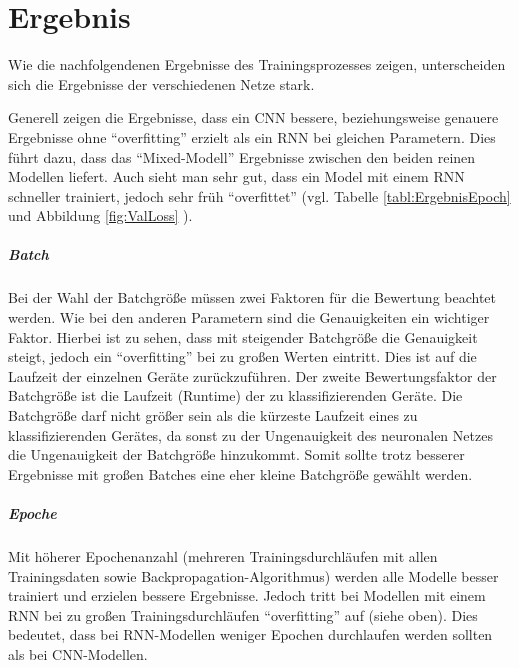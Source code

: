 \chapter{Ergebnis}\label{Ergebnis}

    Wie die nachfolgendenen Ergebnisse des Trainingsprozesses zeigen, unterscheiden sich die Ergebnisse der verschiedenen Netze stark.

    Generell zeigen die Ergebnisse, dass ein \ac{CNN} bessere, beziehungsweise genauere Ergebnisse ohne "`overfitting"' erzielt als ein \ac{RNN} bei gleichen Parametern.
    Dies führt dazu, dass das "`Mixed-Modell"' Ergebnisse zwischen den beiden reinen Modellen liefert.
    Auch sieht man sehr gut, dass ein Model mit einem \ac{RNN} schneller trainiert, jedoch sehr früh "`overfittet"' (vgl. Tabelle \ref{tabl:ErgebnisEpoch} und Abbildung \ref{fig:ValLoss} ).
    
    \paragraph{Batch} 
    Bei der Wahl der Batchgröße müssen zwei Faktoren für die Bewertung beachtet werden. 
    Wie bei den anderen Parametern sind die Genauigkeiten ein wichtiger Faktor. 
    Hierbei ist zu sehen, dass mit steigender Batchgröße die Genauigkeit steigt, jedoch ein "`overfitting"' bei zu großen Werten eintritt.
    Dies ist auf die Laufzeit der einzelnen Geräte zurückzuführen.
    Der zweite Bewertungsfaktor der Batchgröße ist die Laufzeit (Runtime) der zu klassifizierenden Geräte. 
    Die Batchgröße darf nicht größer sein als die kürzeste Laufzeit eines zu klassifizierenden Gerätes, da sonst zu der Ungenauigkeit des neuronalen Netzes die Ungenauigkeit der Batchgröße hinzukommt. %
    Somit sollte trotz besserer Ergebnisse mit großen Batches eine eher kleine Batchgröße gewählt werden.

    \paragraph{Epoche} 
    Mit höherer Epochenanzahl (mehreren Trainingsdurchläufen mit allen Trainingsdaten sowie Backpropagation-Algorithmus) werden alle Modelle besser trainiert und erzielen bessere Ergebnisse.
    Jedoch tritt bei Modellen mit einem \ac{RNN} bei zu großen Trainingsdurchläufen "`overfitting"' auf (siehe oben).
    Dies bedeutet, dass bei \ac{RNN}-Modellen weniger Epochen durchlaufen werden sollten als bei \ac{CNN}-Modellen.

